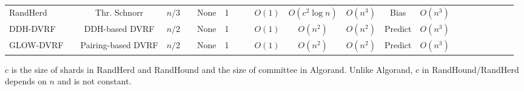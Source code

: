 \documentclass[letterpaper,twocolumn,10pt]{article}
\newcommand{\cmark}{\ding{51}}
\newcommand{\xmark}{\ding{55}}
\theoremstyle{definition}
\theoremstyle{remark}
\begin{document}
\begin{table*}[pt]
\begin{threeparttable}
\begin{tabularx}{\textwidth}{@{}l*{20}c}
RandHerd &  & Thr. Schnorr & $n/3$   & \xmark   & None   & 1   & \xmark    & \xmark   & $O(1)$  & $O(c^2 \log n)$   & $O(n^3)$  & Bias & $O(n^3)$ \\ 
DDH-DVRF &  & DDH-based DVRF  & $n/2$ & \xmark   & None   & 1   & \cmark    & \cmark   & $O(1)$  & $O(n^2)$   & $O(n^2)$  & Predict & $O(n^3)$ \\ 
GLOW-DVRF &  & Pairing-based DVRF  & $n/2$ & \xmark   & None   & 1   & \cmark    & \cmark   & $O(1)$  & $O(n^2)$   & $O(n^2)$  & Predict & $O(n^3)$ \\ 
\bottomrule
\end{tabularx}
\begin{tablenotes}
\item $c$ is the size of shards in RandHerd and RandHound and the size of committee in Algorand. Unlike Algorand, $c$ in RandHound/RandHerd depends on $n$ and is not constant.
\end{tablenotes}
\end{threeparttable}
\end{table*}
\end{document}
